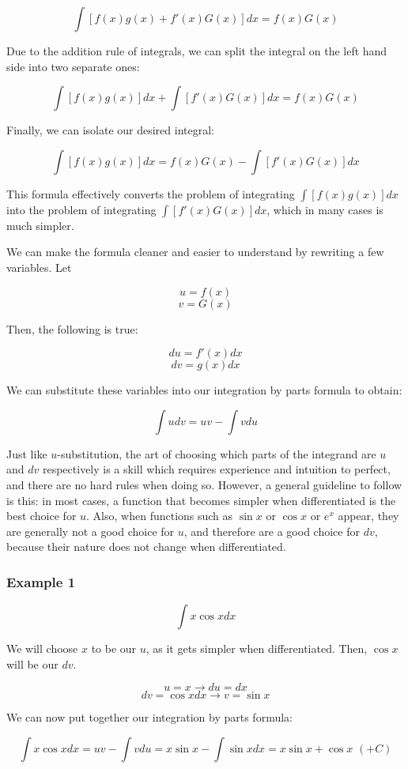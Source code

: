 \documentclass[11pt]{article}
\begin{document}
\[ \int [f(x)g(x) + f'(x)G(x)] dx = f(x)G(x) \]

Due to the addition rule of integrals, we can split the integral on the left hand side into two separate ones:

\[ \int[f(x)g(x)]dx + \int[f'(x)G(x)]dx = f(x)G(x) \]

Finally, we can isolate our desired integral:

\[ \int[f(x)g(x)]dx = f(x)G(x) - \int[f'(x)G(x)]dx \]

This formula effectively converts the problem of integrating $\int[f(x)g(x)]dx$ into the problem of integrating $\int[f'(x)G(x)]dx$, which in many cases is much simpler. 

We can make the formula cleaner and easier to understand by rewriting a few variables. Let 

\[ u = f(x) \]
\[ v = G(x) \]

Then, the following is true:

\[ du = f'(x)dx \]
\[ dv = g(x)dx \]

We can substitute these variables into our integration by parts formula to obtain:

\[ \int u dv = uv - \int v du\]

Just like $u$-substitution, the art of choosing which parts of the integrand are $u$ and $dv$ respectively is a skill which requires experience and intuition to perfect, and there are no hard rules when doing so. However, a general guideline to follow is this: in most cases, a function that becomes simpler when differentiated is the best choice for $u$. Also, when functions such as $\sin x$ or $\cos x$ or $e^x$ appear, they are generally not a good choice for $u$, and therefore are a good choice for $dv$, because their nature does not change when differentiated. 

\subsubsection*{Example 1}
\[ \int x \cos x dx\]

We will choose $x$ to be our $u$, as it gets simpler when differentiated. Then, $\cos x$ will be our $dv$. 

\[ u = x \to du = dx \]
\[ dv = \cos x dx \to v = \sin x \]

We can now put together our integration by parts formula:

\[ \int x \cos x dx = uv - \int v du = x \sin x - \int \sin x dx = x \sin x + \cos x \,\,(+C)\]
\end{document}
